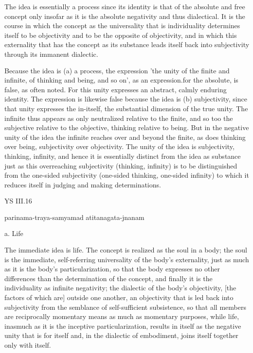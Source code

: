 The idea is essentially a process since its identity is that of the absolute and
free concept only insofar as it is the absolute negativity and thus dialectical.
It is the course in which the concept as the universality that is individuality
determines itself to be objectivity and to be the opposite of objectivity,
and in which this externality that has the concept as its substance leads
itself back into subjectivity through its immanent dialectic.

    Because the idea is (a) a process, the expression 'the unity of the finite
    and infinite, of thinking and being, and so on', as an expression.for
    the absolute, is false, as often noted. For this unity expresses an
    abstract, calmly enduring identity. The expression is likewise false
    because the idea is (b) subjectivity, since that unity expresses the
    in-itself, the substantial dimension of the true unity. The infinite thus
    appears as only neutralized relative to the finite, and so too the
    subjective relative to the objective, thinking relative to being. But
    in the negative unity of the idea the infinite reaches over and beyond
    the finite, as does thinking over being, subjectivity over objectivity.
    The unity of the idea is subjectivity, thinking, infinity, and hence it is
    essentially distinct from the idea as substance just as this overreaching
    subjectivity (thinking, infinity) is to be distinguished from the
    one-sided subjectivity (one-sided thinking, one-sided infinity) to
    which it reduces itself in judging and making determinations.

YS III.16

parinama-traya-samyamad atitanagata-jnanam

a. Life

The immediate idea is life.
The concept is realized as the soul in a body;
the soul is the immediate, self-referring universality of the body's externality,
just as much as it is the body's particularization, so that the body expresses
no other differences than the determination of the concept, and finally
it is the individuality as infinite negativity;
the dialectic of the body's objectivity,
[the factors of which are] outside one another,
an objectivity that is led back into subjectivity from the semblance of self-sufficient
subsistence, so that all members are reciprocally momentary means as
much as momentary purposes, while life, inasmuch as it is the inceptive
particularization, results in itself as the negative unity that is for itself and,
in the dialectic of embodiment, joins itself together only with itself.

